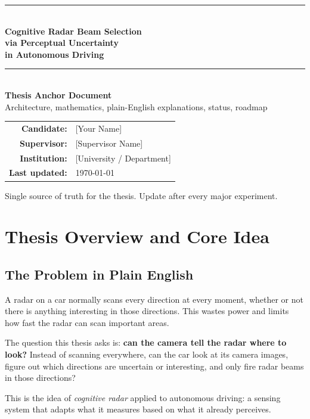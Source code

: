 \documentclass[12pt, a4paper]{article}
\theoremstyle{definition}
\begin{document}

\begin{titlepage}
  \centering\vspace*{1.8cm}
  {\color{thesisblue}\rule{\linewidth}{1.5pt}}\\[0.5cm]
  {\Huge\bfseries\color{thesisblue}
    Cognitive Radar Beam Selection\\[0.35cm]
    via Perceptual Uncertainty\\[0.35cm]
    in Autonomous Driving}\\[0.5cm]
  {\color{thesisblue}\rule{\linewidth}{1.5pt}}\\[1.2cm]
  {\LARGE\bfseries Thesis Anchor Document}\\[0.35cm]
  {\large\color{thesisgray}
    Architecture, mathematics, plain-English explanations, status, roadmap}\\[1.8cm]
  \begin{tabular}{rl}
    \textbf{Candidate:}     & [Your Name]               \\[4pt]
    \textbf{Supervisor:}    & [Supervisor Name]          \\[4pt]
    \textbf{Institution:}   & [University / Department]  \\[4pt]
    \textbf{Last updated:}  & \today                     \\
  \end{tabular}
  \vfill
  {\small\color{thesisgray}
    Single source of truth for the thesis. Update after every major experiment.}
\end{titlepage}

\tableofcontents\newpage

\section{Thesis Overview and Core Idea}
\label{sec:overview}

\subsection{The Problem in Plain English}

\begin{plainbox}
A radar on a car normally scans every direction at every moment, whether or not
there is anything interesting in those directions.
This wastes power and limits how fast the radar can scan important areas.

The question this thesis asks is: \textbf{can the camera tell the radar where
to look?} Instead of scanning everywhere, can the car look at its camera images,
figure out which directions are uncertain or interesting, and only fire radar beams
in those directions?

This is the idea of \emph{cognitive radar} applied to autonomous driving: a
sensing system that adapts what it measures based on what it already perceives.
\end{plainbox}
\end{document}
